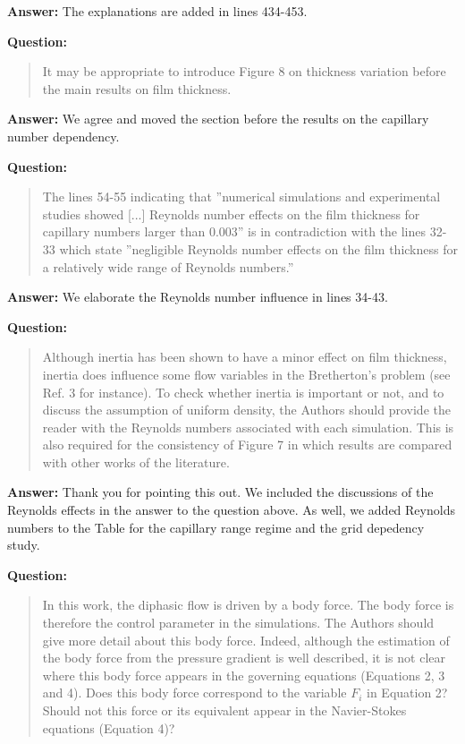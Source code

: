 \documentclass{article}
\begin{document}
\textbf{Answer:} The explanations are added in lines 434-453.
 
\textbf{Question:}
\begin{quotation}
It may be appropriate to introduce Figure 8 on thickness variation before the main results on ﬁlm
thickness.
\end{quotation}

\textbf{Answer:} We agree and moved the section before the results on the capillary number
dependency.


\textbf{Question:}
\begin{quotation}
The lines 54-55 indicating that ”numerical simulations and experimental studies showed [...]
Reynolds
number effects on the film thickness for capillary numbers larger than 0.003” is in contradiction
with
the lines 32-33 which state ”negligible Reynolds number effects on the film thickness for a
relatively
wide range of Reynolds numbers.”
\end{quotation}

\textbf{Answer:} We elaborate the Reynolds number influence in lines 34-43.

\textbf{Question:}
\begin{quotation}
Although inertia has been shown to have a minor effect on ﬁlm thickness, inertia does influence
some flow variables in the Bretherton’s problem (see Ref. 3 for instance). To check whether inertia
is important or not, and to discuss the assumption of uniform density, the Authors should provide
the reader with the Reynolds numbers associated with each simulation. This is also required for the
consistency of Figure 7 in which results are compared with other works of the literature.
\end{quotation}

\textbf{Answer:} Thank you for pointing this out. We included the discussions of the Reynolds
effects in the answer to the question above. As well, we added Reynolds numbers to the Table for
the capillary range regime and the grid depedency study. 

\textbf{Question:}
\begin{quotation}
In this work, the diphasic flow is driven by a body force. The body force is therefore the control
parameter in the simulations. The Authors should give more detail about this body force. Indeed,
although the estimation of the body force from the pressure gradient is well described, it is not
clear
where this body force appears in the governing equations (Equations 2, 3 and 4). Does this body
force correspond to the variable $F_i$ in Equation 2? Should not this force or its equivalent appear
in
the Navier-Stokes equations (Equation 4)?
\end{quotation}
\end{document}
